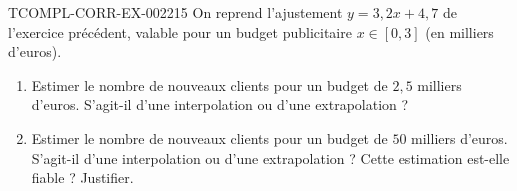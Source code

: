 \begin{exercice}{TCOMPL-CORR-EX-002}{2}{15}
On reprend l'ajustement $y=3{,}2x+4{,}7$ de l'exercice précédent, valable pour un budget publicitaire $x\in[0,3]$ (en milliers d'euros).
\begin{enumerate}
  \item Estimer le nombre de nouveaux clients pour un budget de $2{,}5$ milliers d'euros. S'agit-il d'une interpolation ou d'une extrapolation ?
  \item Estimer le nombre de nouveaux clients pour un budget de $50$ milliers d'euros. S'agit-il d'une interpolation ou d'une extrapolation ? Cette estimation est-elle fiable ? Justifier.
\end{enumerate}
\end{exercice}
